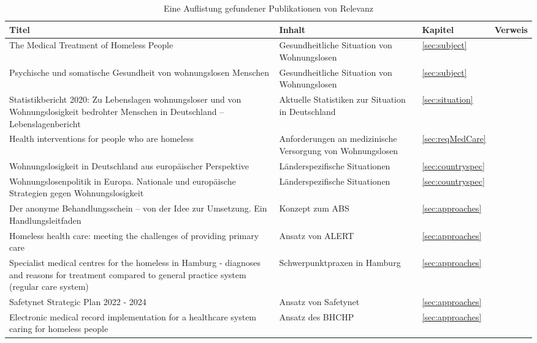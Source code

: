 \begin{sidewaystable}
\begin{table}[H]
	\centering
	\textheight
	\begin{tabulary}{\textheight}{LLLL}
		\toprule
		Titel& Inhalt& Kapitel&	Verweis\\
		\midrule
		The Medical Treatment of Homeless People&
		Gesundheitliche Situation von Wohnungslosen&
		\ref{sec:subject}&
		\citet{Kaduszkiewicz.2017}\\
		Psychische und somatische Gesundheit von wohnungslosen Menschen&
		Gesundheitliche Situation von Wohnungslosen&
		\ref{sec:subject}&
		\citet{DAE228829}\\
		Statistikbericht 2020: Zu Lebenslagen wohnungsloser und von Wohnungslosigkeit bedrohter Menschen in Deutschland -- Lebenslagenbericht&
		Aktuelle Statistiken zur Situation in Deutschland&
		\ref{sec:situation}&
		\citet{BAGW.2022}\\
		Health interventions for people who are homeless&
		Anforderungen an medizinische Versorgung von Wohnungslosen&
		\ref{sec:reqMedCare}&
		\citet{Hwang.2014}\\
		Wohnungslosigkeit in Deutschland aus europäischer Perspektive&
		Länderspezifische Situationen&
		\ref{sec:countryspec}&
		\citet{Busch-Geertsema.2018}\\
		Wohnungslosenpolitik in Europa. Nationale und europäische Strategien gegen Wohnungslosigkeit&
		Länderspezifische Situationen&
		\ref{sec:countryspec}&
		\citet{Busch-Geertsema.2012}\\
		Der anonyme Behandlungsschein -- von der Idee zur Umsetzung. Ein Handlungsleitfaden&
		Konzept zum \ac{ABS}&
		\ref{sec:approaches}&
		\citet{Zanders.2022}\\
		Homeless health care: meeting the challenges of providing primary care&
		Ansatz von ALERT&
		\ref{sec:approaches}&
		\citet{Davies.2018}\\
		Specialist medical centres for the homeless in Hamburg - diagnoses and reasons for treatment compared to general practice system (regular care system)&
		Schwerpunktpraxen in Hamburg&
		\ref{sec:approaches}&
		\citet{Leeden.2023}\\
		Safetynet Strategic Plan 2022 - 2024&
		Ansatz von Safetynet&
		\ref{sec:approaches}&
		\citet{Safetynet.2022}\\
		Electronic medical record implementation for a healthcare system caring for homeless people&
		Ansatz des BHCHP&
		\ref{sec:approaches}&
		\citet{Angoff.2019}\\
		\bottomrule
	\end{tabulary}
	\caption[Relevante Publikationen]{Eine Auflistung gefundener Publikationen von Relevanz}
	\label{tab:pub}
\end{table}
\end{sidewaystable}

